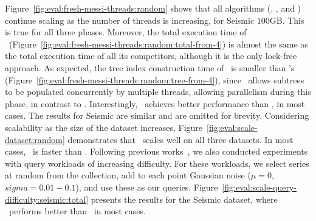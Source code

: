 Figure~\ref{fig:eval:fresh-messi-threads:random} shows that all algorithms
(\Fresh, \MESSI, and \MESSIenh) continue scaling as the number of threads is increasing,
for Seismic 100GB. This is true for all three phases. 
Moreover, the total execution time of \Fresh\ 
(Figure~\ref{fig:eval:fresh-messi-threads:random:total-from-4})
is almost the same as the total execution time of all its competitors, although it is the
only lock-free approach. 
As expected, the tree index construction time of \Fresh\ is smaller than \MESSI's 
(Figure~\ref{fig:eval:fresh-messi-threads:random:tree-from-4}), since \Fresh\ allows
subtrees to be populated concurrently by multiple threads, allowing parallelism during
this phase, in contrast to \MESSI. 
Interestingly, \Fresh\ achieves better performance than \MESSIenh, in most cases.
The results for Seismic are similar and are omitted for brevity.
Considering scalability as the size of the dataset increases, 
Figure~\ref{fig:eval:scale-dataset:random} demonstrates that \Fresh\ scales well
on all three datasets. In most cases, \Fresh\ is faster than \MESSI.
Following previous works~\cite{DBLP:journals/vldb/ZoumpatianosLIP18,PFP21-I},
we also conducted experiments with query workloads of increasing difficulty.
For these workloads, we select series at random from the collection, add to each point
Gaussian noise ($\mu = 0$, $sigma = 0.01-0.1$), and use these as our queries. 
Figure~\ref{fig:eval:scale-query-difficulty:seismic:total} presents the results for
the Seismic dataset, where \Fresh\ performs better than \MESSI\ in most cases.



